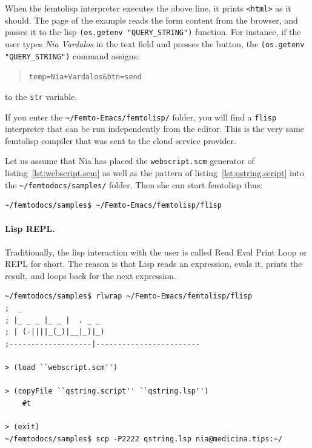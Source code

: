 \documentclass[a4paper,12pt]{book}
\begin{document}
When the femtolisp interpreter executes
the above line, it prints \verb|<html>|
as it should. The page of the example
reads the form content from the browser,
and passes it to
the lisp \verb|(os.getenv "QUERY_STRING")|
function. For instance, if the user
types {\em Nia Vardalos} in the text field
and presses the  button,
the  \verb|(os.getenv "QUERY_STRING")| command
assigns:
\begin{quote}
  \verb|temp=Nia+Vardalos&btn=send|
\end{quote}
to the \verb|str| variable.


If you enter the \verb|~/Femto-Emacs/femtolisp/|
folder, you will find a \verb|flisp|
interpreter that can be run independently
from the editor. This is the very same
femtolisp compiler that was sent to
the cloud service provider.

Let us assume that Nia has placed the
\verb|webscript.scm| generator of
listing~\ref{lst:webscript.scm}
as well as the pattern of
listing~\ref{lst:qstring.script}
into the \verb|~/femtodocs/samples/| folder.
Then she can start femtolisp thus:
\begin{verbatim}
~/femtodocs/samples$ ~/Femto-Emacs/femtolisp/flisp
\end{verbatim}

\paragraph{Lisp REPL.} Traditionally, the lisp
interaction with the user is called Read Eval
Print Loop or REPL for short. The reason is that
Lisp reads an expression, evals it, prints the
result, and loops back for the next expression.

\begin{Verbatim}[fontsize=\small,
    frame=single,
    framerule=0.5mm]
~/femtodocs/samples$ rlwrap ~/Femto-Emacs/femtolisp/flisp
;  _
; |_ _ _ |_ _ |  . _ _
; | (-||||_(_)|__|_)|_)
;-------------------|------------------------

> (load ``webscript.scm'')

> (copyFile ``qstring.script'' ``qstring.lsp'')
    #t

> (exit)
~/femtodocs/samples$ scp -P2222 qstring.lsp nia@medicina.tips:~/
\end{Verbatim}
\end{document}

